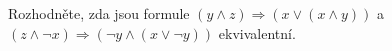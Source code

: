 Rozhodněte, zda jsou formule $(y\wedge z)\Rightarrow (x \vee (x\wedge y))$ a
$(z\wedge \neg x)\Rightarrow (\neg y\wedge (x\vee \neg y))$ ekvivalentní.
